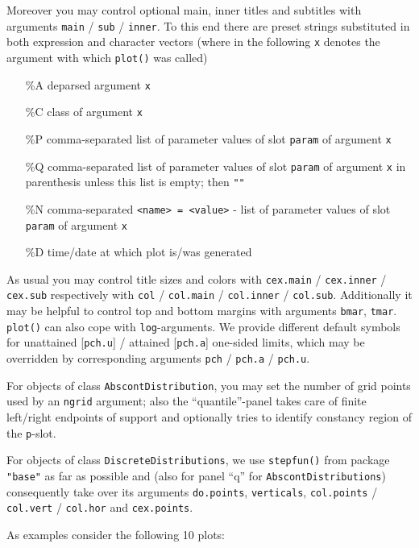 \documentclass[11pt]{article}
\newcommand{\code}[1]{{\tt #1}}
\newcommand{\pkg}[1]{{\tt "#1"}}
\begin{document}
Moreover you may control optional main, inner titles and subtitles with
arguments \code{main} / \code{sub} / \code{inner}. To this end there are
preset strings substituted in both expression and character vectors
(where in the following \code{x} denotes the argument
with which \code{plot()} was called)
\begin{itemize}
 \item[\%A] deparsed argument \code{x}
 \item[\%C] class of argument \code{x}
 \item[\%P] comma-separated list of parameter values of slot \code{param} of
            argument \code{x}
 \item[\%Q] comma-separated list of parameter values of slot \code{param} of
            argument \code{x} in parenthesis unless this list is empty; then
            \code{""}
 \item[\%N] comma-separated {\tt <name> = <value>} - list of parameter values of
            slot \code{param} of argument \code{x}
 \item[\%D] time/date at which plot is/was generated
\end{itemize}
As usual you may control title sizes and colors with
\code{cex.main} / \code{cex.inner} / \code{cex.sub} respectively with
\code{col} / \code{col.main} / \code{col.inner} / \code{col.sub}. Additionally
it may be helpful to control top and bottom margins with arguments
\code{bmar}, \code{tmar}. \code{plot()} can also cope with \code{log}-arguments.
We provide different default symbols for unattained [\code{pch.u}] / attained
[\code{pch.a}] one-sided limits, which may be overridden by corresponding
arguments  \code{pch} / \code{pch.a} / \code{pch.u}.

For objects of class \code{AbscontDistribution}, you may set the number of grid
points used by an \code{ngrid} argument; also the ``quantile''-panel
takes care of finite left/right endpoints of support and optionally tries
to identify constancy region of the \code{p}-slot.

For objects of class \code{DiscreteDistributions}, we use \code{stepfun()} from
package \pkg{base} as far as possible and (also for panel ``q'' for
\code{AbscontDistributions}) consequently take over its arguments
\code{do.points}, \code{verticals}, \code{col.points} / \code{col.vert} /
\code{col.hor} and \code{cex.points}.

As examples consider the following 10 plots:
\end{document}
